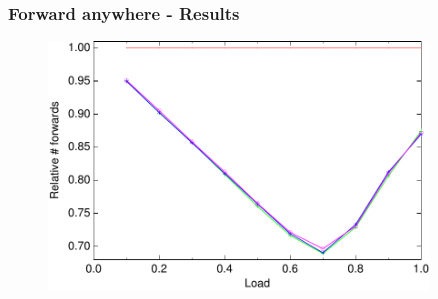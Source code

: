 \documentclass[compress]{beamer}
\begin{document}
\begin{frame}
\frametitle{Forward anywhere - Results}
\begin{figure}[h!tb]
 \includegraphics[width=0.9\textwidth]{../data/anywhere.pdf}
 \end{figure}
\end{frame}
\end{document}
